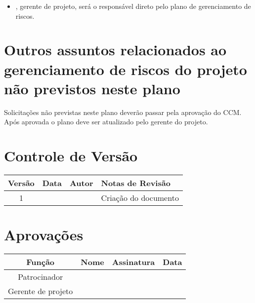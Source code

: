 \begin{itemize}
	\item \projectManagerName{}, gerente de projeto, será o responsável direto pelo plano de gerenciamento de riscos.
\end{itemize}

\section{Outros assuntos relacionados ao gerenciamento de riscos do projeto não previstos neste plano}

Solicitações não previstas neste plano deverão passar pela aprovação do CCM. Após aprovada o plano deve ser atualizado pelo gerente do projeto.

\section{Controle de Versão}

\begin{table}[H]
	\begin{tabularx}{\textwidth}{| c | c | X | X |}
		\hline
		\textbf{Versão} & \textbf{Data} & \textbf{Autor}        & \textbf{Notas de Revisão} \\
		\hline
		1                &               & \projectManagerName{} & Criação do documento     \\
		\hline
	\end{tabularx}
	\centering
\end{table}

\section{Aprovações}

\begin{table}[H]
	\begin{tabularx}{\textwidth}{| c | c | X | c |}
		\hline
		\textbf{Função}  & \textbf{Nome}         & \textbf{Assinatura}        & \textbf{Data} \\
		\hline
		Patrocinador       & \projectSponsorName{} & \projectSponsorSignature{} &               \\
		\hline
		Gerente de projeto & \projectManagerName{} & \projectManagerSignature{} &               \\
		\hline
	\end{tabularx}
	\centering
\end{table}